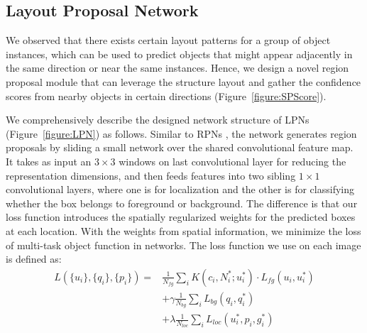 \documentclass[10pt,twocolumn,letterpaper]{article}
\begin{document}
\subsection{Layout Proposal Network}

We observed that there exists certain layout patterns for a group of object instances, which can be used to predict objects that might appear adjacently in the same direction or near the same instances. Hence, we design a novel region proposal module that can leverage the structure layout and gather the confidence scores from nearby objects in certain directions (Figure~\ref{figure:SPScore}).


We comprehensively describe the designed network structure of LPNs (Figure~\ref{figure:LPN}) as follows. Similar to RPNs \cite{21_ren2015faster}, the network generates region proposals by sliding a small network over the shared convolutional feature map. It takes as input an $3 \times 3$ windows on last convolutional layer for reducing the representation dimensions, and then feeds features into two sibling $1 \times 1$ convolutional layers, where one is for localization and the other is for classifying whether the box belongs to foreground or background. The difference is that our loss function introduces the spatially regularized weights for the predicted boxes at each location. With the weights from spatial information, we minimize the loss of multi-task object function in networks. The loss function we use on each image is defined as:
\begin{equation} \label{eq:1}
\begin{aligned}
L(\{u_{i}\}, \{q_{i}\}, \{p_{i}\}) =& \frac{1}{N_{fg}} \sum_{i} K(c_{i}, N_{i}^{*};u_{i}^{*}) \cdot L_{fg}(u_{i}, u_{i}^{*}) \\
& + \gamma  \frac{1}{N_{bg}} \sum_{i} L_{bg}(q_{i}, q_{i}^{*}) \\
& + \lambda \frac{1}{N_{loc}} \sum_{i} L_{loc}(u_{i}^{*}, p_{i}, g_{i}^{*})
\end{aligned}
\end{equation}
\end{document}
